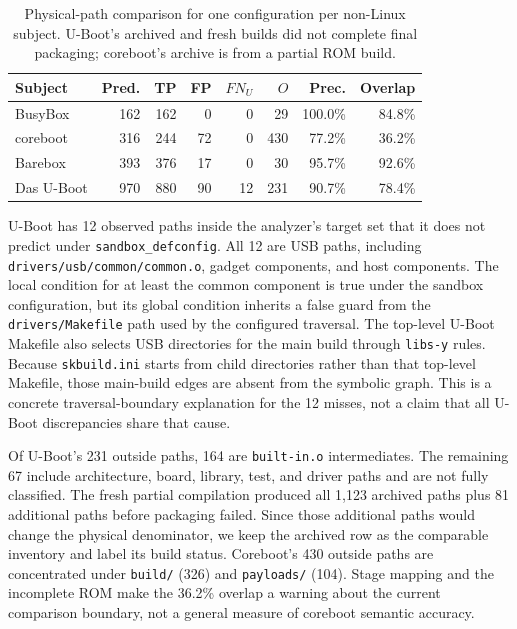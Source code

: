 \documentclass[acmsmall,screen,review]{acmart}
\begin{document}
\begin{table}[t]
\centering\footnotesize
\caption{Physical-path comparison for one configuration per non-Linux subject. U-Boot's archived and fresh builds did not complete final packaging; coreboot's archive is from a partial ROM build.}
\label{tab:firmware-physical}
\begin{tabular}{lrrrrrrr}
\toprule
Subject & Pred. & TP & FP & $FN_U$ & $O$ & Prec. & Overlap \\
\midrule
BusyBox & 162 & 162 & 0 & 0 & 29 & 100.0\% & 84.8\% \\
coreboot & 316 & 244 & 72 & 0 & 430 & 77.2\% & 36.2\% \\
Barebox & 393 & 376 & 17 & 0 & 30 & 95.7\% & 92.6\% \\
Das U-Boot & 970 & 880 & 90 & 12 & 231 & 90.7\% & 78.4\% \\
\bottomrule
\end{tabular}
\end{table}

U-Boot has 12 observed paths inside the analyzer's target set that it does not predict under \texttt{sandbox\_defconfig}. All 12 are USB paths, including \texttt{drivers/usb/common/common.o}, gadget components, and host components. The local condition for at least the common component is true under the sandbox configuration, but its global condition inherits a false guard from the \texttt{drivers/Makefile} path used by the configured traversal. The top-level U-Boot Makefile also selects USB directories for the main build through \texttt{libs-y} rules. Because \texttt{skbuild.ini} starts from child directories rather than that top-level Makefile, those main-build edges are absent from the symbolic graph. This is a concrete traversal-boundary explanation for the 12 misses, not a claim that all U-Boot discrepancies share that cause.

Of U-Boot's 231 outside paths, 164 are \texttt{built-in.o} intermediates. The remaining 67 include architecture, board, library, test, and driver paths and are not fully classified. The fresh partial compilation produced all 1,123 archived paths plus 81 additional paths before packaging failed. Since those additional paths would change the physical denominator, we keep the archived row as the comparable inventory and label its build status. Coreboot's 430 outside paths are concentrated under \texttt{build/} (326) and \texttt{payloads/} (104). Stage mapping and the incomplete ROM make the 36.2\% overlap a warning about the current comparison boundary, not a general measure of coreboot semantic accuracy.
\end{document}
